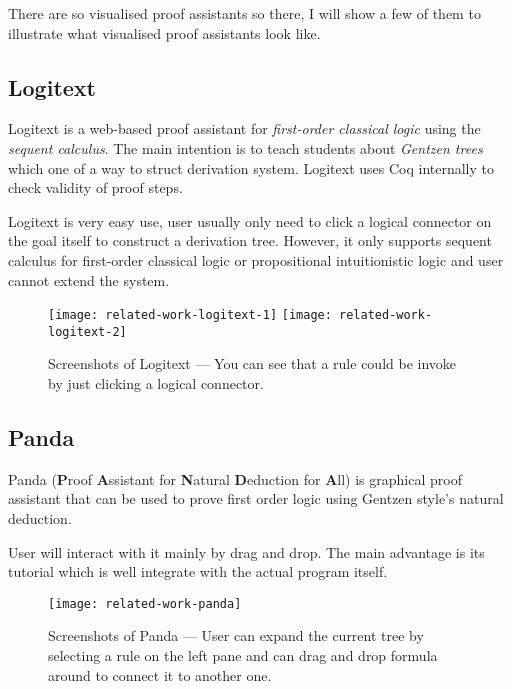 \documentclass[master.tex]{subfiles}
\begin{document}
There are so visualised proof assistants so there, I will show a few of them to
illustrate what visualised proof assistants look like.

\subsection{Logitext}
Logitext\supercite{logitext-official-website} is a web-based proof assistant for
\emph{first-order classical logic} using the \emph{sequent calculus}. The main
intention is to teach students about \emph{Gentzen trees} which one of a way to
struct derivation system. Logitext uses Coq internally to check validity of
proof steps.

Logitext is very easy use, user usually only need to click a logical connector
on the goal itself to construct a derivation tree. However, it only supports
sequent calculus for first-order classical logic or propositional intuitionistic
logic and user cannot extend the system.

\begin{figure}[H]
    \centering
    \texttt{[image: related-work-logitext-1]}
    \texttt{[image: related-work-logitext-2]}
    \caption{Screenshots of Logitext --- You can see that a rule could be invoke
      by just clicking a logical connector.}
\label{fig:related-work-logitext}
\end{figure}

\subsection{Panda}
Panda\supercite{panda-official-website}\supercite{Gasquet2011} (\textbf{P}roof
\textbf{A}ssistant for \textbf{N}atural \textbf{D}eduction for \textbf{A}ll) is
graphical proof assistant that can be used to prove first order logic using
Gentzen style's natural deduction.

User will interact with it mainly by drag and drop. The main advantage is its
tutorial which is well integrate with the actual program itself.

\begin{figure}[H]
    \centering
    \texttt{[image: related-work-panda]}
    \caption{Screenshots of Panda --- User can expand the current tree by
      selecting a rule on the left pane and can drag and drop formula around to
      connect it to another one.}
\label{fig:related-work-panda}
\end{figure}
\end{document}
